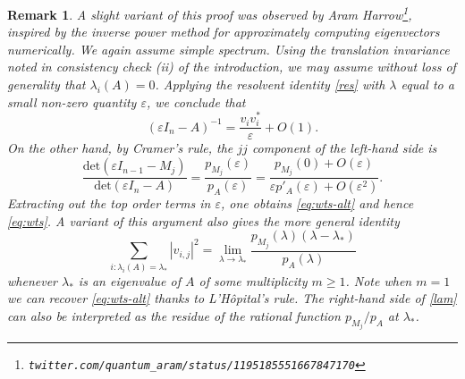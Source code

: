\documentclass[12pt]{amsart}
\newcommand\eps{\varepsilon}
\newtheorem{remark}[lemma]{Remark}
\begin{document}
\begin{remark} A slight variant of this proof was observed by Aram Harrow\footnote{{\tt twitter.com/quantum\_aram/status/1195185551667847170}}, inspired by the inverse power method for approximately computing eigenvectors numerically.  We again assume simple spectrum. Using the translation invariance noted in consistency check (ii) of the introduction, we may assume without loss of generality that $\lambda_i(A)=0$.  Applying the resolvent identity \eqref{res} with $\lambda$ equal to a small non-zero quantity $\eps$, we conclude that
\begin{equation}\label{epsin}
 (\eps I_n - A)^{-1} = \frac{v_i v_i^*}{\eps} + O(1).
\end{equation}
On the other hand, by Cramer's rule, the $jj$ component of the left-hand side is 
$$ \frac{\mathrm{det}(\eps I_{n-1} - M_j)}{\mathrm{det}(\eps I_n - A)} = \frac{p_{M_j}(\eps)}{p_A(\eps)} = \frac{p_{M_j}(0) + O(\eps)}{\eps p'_A(\eps) + O(\eps^2)}.$$
Extracting out the top order terms in $\eps$, one obtains \eqref{eq:wts-alt} and hence \eqref{eq:wts}.  A variant of this argument also gives the more general identity
\begin{equation}\label{lam}
 \sum_{i: \lambda_i(A) = \lambda_*} |v_{i,j}|^2 = \lim_{\lambda \to \lambda_*} \frac{p_{M_j}(\lambda) (\lambda - \lambda_*)}{p_A(\lambda)}
\end{equation}
whenever $\lambda_*$ is an eigenvalue of $A$ of some multiplicity $m \geq 1$.  Note when $m=1$ we can recover \eqref{eq:wts-alt} thanks to L'H\^{o}pital's rule.  The right-hand side of \eqref{lam} can also be interpreted as the residue of the rational function $p_{M_j}/p_A$ at $\lambda_*$.
\end{remark}
\end{document}
